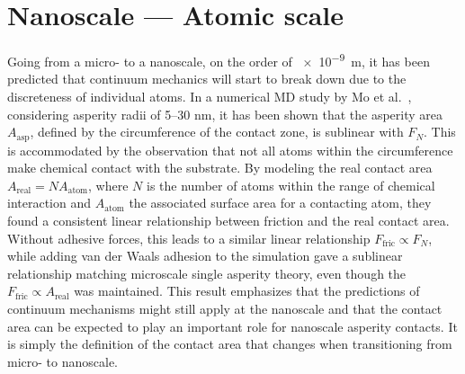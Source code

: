 









%
\section{Nanoscale --- Atomic scale}\label{sec:nanoscale}
Going from a micro- to a nanoscale, on the order of \SI{e-9}{m}, it has been
predicted that continuum mechanics will start to break down
\cite{luan_breakdown_2005} due to the discreteness of individual atoms. In a
numerical \acrshort{MD} study by Mo et al.~\cite{mo_friction_2009}, considering
asperity radii of 5--30 nm, it has been shown that the asperity area
$A_{\text{asp}}$, defined by the circumference of the contact zone, is
sublinear with $F_N$. This is accommodated by the observation that not all atoms
within the circumference make chemical contact with the substrate. By modeling
the real contact area $A_{\text{real}} = NA_{\text{atom}}$, where $N$ is the
number of atoms within the range of chemical interaction and $A_{\text{atom}}$
the associated surface area for a contacting atom, they found a consistent linear relationship between friction and the real contact area. Without adhesive
forces, this leads to a similar linear relationship $F_{\text{fric}} \propto F_N$,
while adding van der Waals adhesion to the simulation gave a sublinear
relationship matching microscale single asperity theory, even though the
$F_{\text{fric}} \propto A_{\text{real}}$ was maintained. This result emphasizes
that the predictions of continuum mechanisms might still apply at the nanoscale
and that the contact area can be expected to play an important role for
nanoscale asperity contacts. It is simply the definition of the contact area that
changes when transitioning from micro- to nanoscale. 


